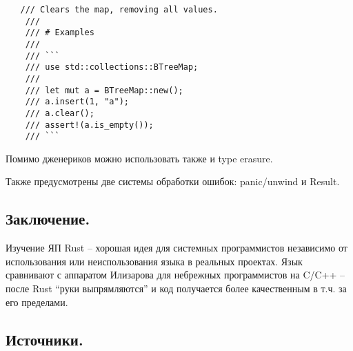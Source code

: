\documentclass[10pt, a5paper]{article}
\begin{document}
\begin{verbatim}
   /// Clears the map, removing all values.
    ///
    /// # Examples
    ///
    /// ```
    /// use std::collections::BTreeMap;
    ///
    /// let mut a = BTreeMap::new();
    /// a.insert(1, "a");
    /// a.clear();
    /// assert!(a.is_empty());
    /// ```\end{verbatim}
Помимо дженериков можно использовать также и type erasure.

Также предусмотрены две системы обработки ошибок: panic/unwind и Result.

\subsection*{Заключение.}

Изучение ЯП Rust -- хорошая идея для системных программистов независимо от использования или неиспользования языка в реальных проектах. Язык сравнивают с аппаратом Илизарова для небрежных программистов на C/C++ -- после Rust ``руки выпрямляются'' и код получается более качественным в т.ч. за его пределами.

\subsection*{Источники.}

\end{document}
